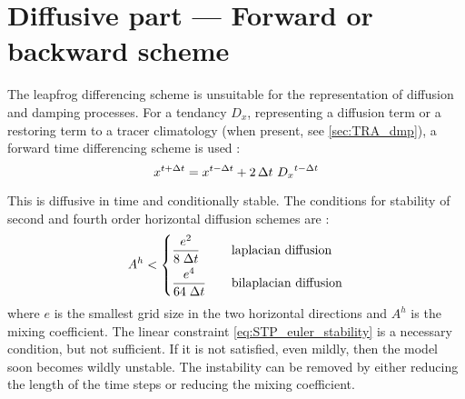 \documentclass[../tex_main/NEMO_manual]{subfiles}
\begin{document}
\section{Diffusive part --- Forward or backward scheme}
\label{sec:STP_forward_imp}

The leapfrog differencing scheme is unsuitable for the representation of diffusion and damping processes.
For a tendancy $D_x$, representing a diffusion term or a restoring term to a tracer climatology
(when present, see \autoref{sec:TRA_dmp}), a forward time differencing scheme is used :
\begin{equation} \label{eq:STP_euler}
   x^{t+\Delta t} = x^{t-\Delta t} + 2 \, \Delta t \ {D_x}^{t-\Delta t}
\end{equation} 

This is diffusive in time and conditionally stable.
The conditions for stability of second and fourth order horizontal diffusion schemes are \citep{Griffies_Bk04}:
\begin{equation} \label{eq:STP_euler_stability}
A^h < \left\{
\begin{aligned}
                    &\frac{e^2}{  8 \; \Delta t } 	&&\quad \text{laplacian diffusion} 	\\
                    &\frac{e^4}{64 \; \Delta t } 	&&\quad \text{bilaplacian diffusion} 
            \end{aligned}
\right.
\end{equation}
where $e$ is the smallest grid size in the two horizontal directions and $A^h$ is the mixing coefficient.
The linear constraint \autoref{eq:STP_euler_stability} is a necessary condition, but not sufficient.
If it is not satisfied, even mildly, then the model soon becomes wildly unstable.
The instability can be removed by either reducing the length of the time steps or reducing the mixing coefficient.
\end{document}
